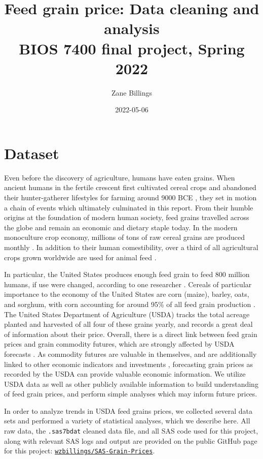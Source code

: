 \documentclass[11pt]{article}
\title{
	Feed grain price: Data cleaning and analysis \\
	\Large BIOS 7400 final project, Spring 2022
}
\author{Zane Billings}
\date{2022-05-06}
\begin{document}
\maketitle

\section*{Dataset}

Even before the discovery of agriculture, humans have eaten grains. When ancient
humans in the fertile crescent first cultivated cereal crops and abandoned their
hunter-gatherer lifestyles for farming around 9000 BCE \cite{zeder2011}, they
set in motion a chain of events which ultimately culminated in this report.
From their humble origins at the foundation of modern human society, feed grains
travelled across the globe and remain an economic and dietary staple today. In
the modern monoculture crop economy, millions of tons of raw cereal grains
are produced monthly \cite{fao}. In addition to their human comestibility,
over a third of all agricultural crops grown worldwide are used for animal
feed \cite{cassidy2013}.

In particular, the United States produces enough feed grain to feed 800 million
humans, if use were changed, according to one researcher \cite{chron}.
Cereals of particular importance to the economy of the United States are corn
(maize), barley, oats, and sorghum, with corn accounting for around 95\% of all
feed grain production \cite{ataglance}. The United States Department of
Agriculture (USDA) tracks the total acreage planted and harvested of all four
of these grains yearly, and records a great deal of information about their
price. Overall, there is a direct link between feed grain prices and
grain commodity futures, which are strongly affected by USDA forecasts
\cite{arnade2021}. As commodity futures are valuable in themselves, and are
additionally linked to other economic indicators and investments
\cite{irwin2011}, forecasting grain prices as recorded by the USDA can provide
valuable economic information. We utilize USDA data as well as other publicly
available information to build understanding of feed grain prices, and perform
simple analyses which may inform future prices.

In order to analyze trends in USDA feed grains prices, we collected several
data sets and performed a variety of statistical analyses, which we describe
here. All raw data, the \texttt{.sas7bdat} cleaned data file, and all SAS code
used for this project, along with relevant SAS logs and output are provided on
the public GitHub page for this project:
\href{https://github.com/wzbillings/SAS-Grain-Prices}{\texttt{wzbillings/SAS-Grain-Prices}}.
\end{document}
